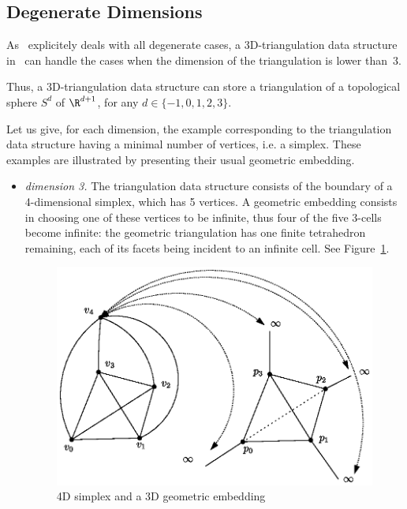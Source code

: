 \subsection{Degenerate Dimensions}
\label{TDS3-sec-degen_dim}
As \cgal\ explicitely deals with all degenerate cases, a
3D-triangulation data structure in \cgal\ can handle the cases when
the dimension of the triangulation is lower than~3.

Thus, a 3D-triangulation data structure can store a triangulation of a
topological sphere $S^d$ of $\R^{d+1}$, for any $d \in \{-1,0,1,2,3\}$. 

Let us give, for each dimension, the example corresponding to the
triangulation data structure having a minimal number of vertices, i.e. a 
simplex. These examples are illustrated by presenting their usual
geometric embedding. 
\begin{itemize}
\item \emph{dimension 3.} The triangulation data structure consists of
the boundary of a 4-dimensional simplex, which has 5 vertices. A
geometric embedding consists in choosing one of these vertices to be
infinite, thus four of the five 3-cells become infinite: the geometric
triangulation has one finite tetrahedron remaining, each of its facets
being incident to an infinite cell. See Figure~\ref{TDS3-fig-topo-simplex4}.
\begin{ccTexOnly}
\begin{figure}
\begin{center} 
\includegraphics{topo-simplex4.eps}
\end{center}
\caption{4D simplex and a 3D geometric embedding \label{TDS3-fig-topo-simplex4}}
\end{figure} 

\end{ccTexOnly}
\end{itemize}
